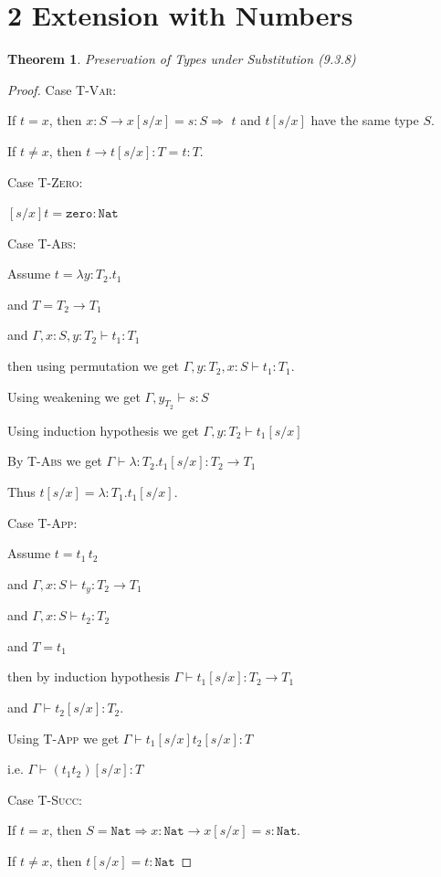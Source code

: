 \documentclass[13pt, a4paper]{article}
\newtheorem{theorem}{Theorem}
\begin{document}
\section*{2 Extension with Numbers}

\begin{theorem}\label{thm:2-substitution}
Preservation of Types under Substitution (9.3.8)
\begin{prooftree}
\end{prooftree}
\end{theorem}

\begin{proof}
Case \textsc{T-Var}:

If $t = x$, then $x : S \to x[s/x] = s : S \Rightarrow $ $t$ and $t[s/x]$ have the same type $S$.

If $t \ne x$, then $t \to t[s/x] : T = t : T$.

\noindent Case \textsc{T-Zero}:

$[s/x]t = \texttt{zero} : \texttt{Nat}$

\noindent Case \textsc{T-Abs}:

Assume $t = \lambda y:T_2.t_1$

and $T = T_2\to T_1$

and $\Gamma, x:S,y:T_2 \vdash t_1 :T_1$

then using permutation we get $\Gamma, y:T_2,x:S \vdash t_1 : T_1$.

Using weakening we get $\Gamma, y_T_2 \vdash s : S$

Using induction hypothesis we get $\Gamma, y:T_2 \vdash t_1[s/x]$

By \textsc{T-Abs} we get $\Gamma \vdash \lambda:T_2.t_1[s/x] : T_2\to T_1$

Thus $t[s/x] = \lambda:T_1.t_1[s/x]$.

\noindent Case \textsc{T-App}:

Assume $t = t_1\,t_2$

and $\Gamma, x:S \vdash t_y : T_2 \to T_1$

and $\Gamma, x : S \vdash t_2 : T_2$

and $T = t_1$

then by induction hypothesis $\Gamma \vdash t_1[s/x] : T_2 \to T_1$

and $\Gamma \vdash t_2[s/x] : T_2$.

Using \textsc{T-App} we get $\Gamma \vdash t_1[s/x] t_2[s/x]: T$

i.e. $\Gamma \vdash (t_1 t_2)[s/x] : T$

\noindent Case \textsc{T-Succ}:

If $t = x$, then $S = \texttt{Nat} \Rightarrow x:\texttt{Nat} \to x[s/x] = s : \texttt{Nat}$.

If $t \ne x$, then $t[s/x] = t : \texttt{Nat}$

\end{proof}
\end{document}
